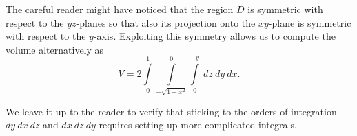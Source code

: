 \begin{example}


The careful reader might have noticed that the region $D$ is symmetric with respect to the $yz$-planes so that also its projection onto the $xy$-plane is symmetric with respect to the $y$-axis. Exploiting this symmetry allows us to compute the volume alternatively as
$$V = 2\int\limits_{0}^1\int\limits_{-\sqrt{1-x^2}}^{0}\int\limits_0^{-y}\ dz\ dy\ dx.$$

We leave it up to the reader to verify that sticking to the orders of integration $dy\ dx\ dz$ and $dx\ dz\ dy$ requires setting up more complicated integrals.


\begin{figure}[H]
\centering
\centerline{
\qquad
{}}


\end{figure}
\end{example}
